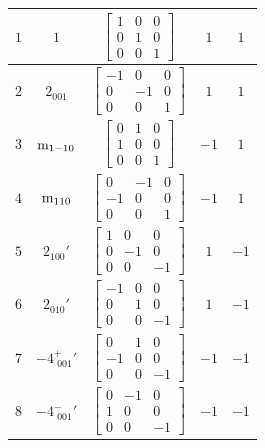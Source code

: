 \documentclass[fleqn,8pt]{jsarticle}
\begin{document}
\begin{longtable}{ccccc}
$ 1 $ & $ 1 $ & $ \begin{bmatrix} 1 & 0 & 0 \\ 0 & 1 & 0 \\ 0 & 0 & 1 \end{bmatrix} $ & $ 1 $ & $ 1 $ \\ \hline
$ 2 $ & $ 2{}_{001} $ & $ \begin{bmatrix} -1 & 0 & 0 \\ 0 & -1 & 0 \\ 0 & 0 & 1 \end{bmatrix} $ & $ 1 $ & $ 1 $ \\ \hline
$ 3 $ & $ {\rm m}_{1-10} $ & $ \begin{bmatrix} 0 & 1 & 0 \\ 1 & 0 & 0 \\ 0 & 0 & 1 \end{bmatrix} $ & $ -1 $ & $ 1 $ \\ \hline
$ 4 $ & $ {\rm m}_{110} $ & $ \begin{bmatrix} 0 & -1 & 0 \\ -1 & 0 & 0 \\ 0 & 0 & 1 \end{bmatrix} $ & $ -1 $ & $ 1 $ \\ \hline
$ 5 $ & $ 2{}_{100}{}' $ & $ \begin{bmatrix} 1 & 0 & 0 \\ 0 & -1 & 0 \\ 0 & 0 & -1 \end{bmatrix} $ & $ 1 $ & $ -1 $ \\ \hline
$ 6 $ & $ 2{}_{010}{}' $ & $ \begin{bmatrix} -1 & 0 & 0 \\ 0 & 1 & 0 \\ 0 & 0 & -1 \end{bmatrix} $ & $ 1 $ & $ -1 $ \\ \hline
$ 7 $ & $ -4^{+}_{\,\,001}{}' $ & $ \begin{bmatrix} 0 & 1 & 0 \\ -1 & 0 & 0 \\ 0 & 0 & -1 \end{bmatrix} $ & $ -1 $ & $ -1 $ \\ \hline
$ 8 $ & $ -4^{-}_{\,\,001}{}' $ & $ \begin{bmatrix} 0 & -1 & 0 \\ 1 & 0 & 0 \\ 0 & 0 & -1 \end{bmatrix} $ & $ -1 $ & $ -1 $ \\
\end{longtable}
\end{document}
